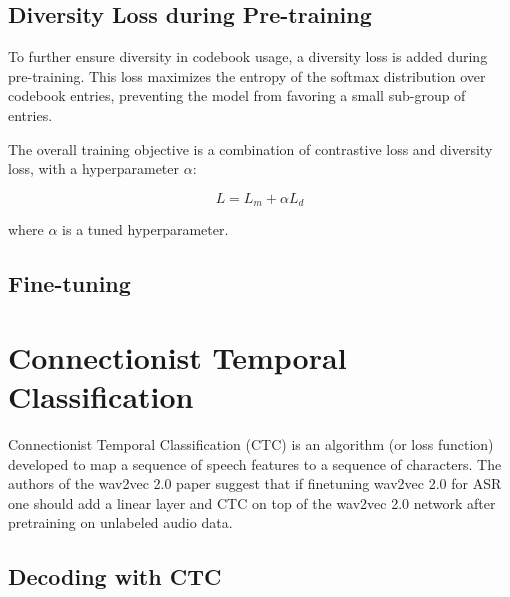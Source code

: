 \subsection{Diversity Loss during Pre-training}

To further ensure diversity in codebook usage, a diversity loss is added during pre-training. This loss maximizes the entropy of the softmax distribution over codebook entries, preventing the model from favoring a small sub-group of entries.

The overall training objective is a combination of contrastive loss and diversity loss, with a hyperparameter $\alpha$:

\begin{equation}
L = L_m + \alpha L_d
\end{equation}

where $\alpha$ is a tuned hyperparameter.



































\subsection{Fine-tuning}

\section{Connectionist Temporal Classification}
Connectionist Temporal Classification (CTC) \cite{graves2006connectionist} is an algorithm (or loss function) 
developed to map a sequence of speech features to a sequence of characters. The authors of the wav2vec 2.0 paper
suggest that if finetuning wav2vec 2.0 for ASR one should add a linear layer and CTC on top of the wav2vec 2.0 
network after pretraining on unlabeled audio data.



\subsection{Decoding with CTC}




